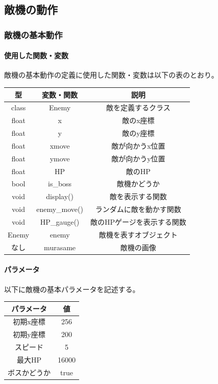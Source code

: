 \documentclass[a4paper,titlepage,11pt]{ltjsarticle}
\begin{document}
\subsection{敵機の動作}
\label{Enemy}
\subsubsection{敵機の基本動作}
\paragraph{使用した関数・変数}
敵機の基本動作の定義に使用した関数・変数は以下の表のとおり。
\begin{table}[H]
	\begin{center}
		\begin{tabular}{|c|c|c|}
			\hline
			型 & 変数・関数 & 説明\\  \hline \hline
			class & Enemy & 敵を定義するクラス \\ \hline
			float & x & 敵のx座標 \\ \hline 
			float & y & 敵のy座標 \\ \hline 
			float & xmove & 敵が向かうx位置 \\ \hline 
			float & ymove & 敵が向かうy位置 \\ \hline 
			float & HP & 敵のHP \\ \hline 
			bool & is\_boss & 敵機かどうか \\ \hline
			void & display() & 敵を表示する関数 \\ \hline 
			void & enemy\_move() & ランダムに敵を動かす関数 \\ \hline
			void & HP\_gauge() & 敵のHPゲージを表示する関数 \\ \hline 
			Enemy & enemy & 敵機を表すオブジェクト \\ \hline
			なし & murasame & 敵機の画像 \\ \hline
		\end{tabular}
	\end{center}
\end{table}
\paragraph{パラメータ}
以下に敵機の基本パラメータを記述する。
\begin{table}[H]
	\begin{center}
		\begin{tabular}{|c|c|}
			\hline
			パラメータ & 値\\ \hline \hline
			初期x座標 & 256 \\ \hline
			初期y座標 & 200 \\ \hline
			スピード & 5 \\ \hline
			最大HP & 16000 \\ \hline
			ボスかどうか & true \\ \hline
		\end{tabular}
	\end{center}
\end{table}
\end{document}

